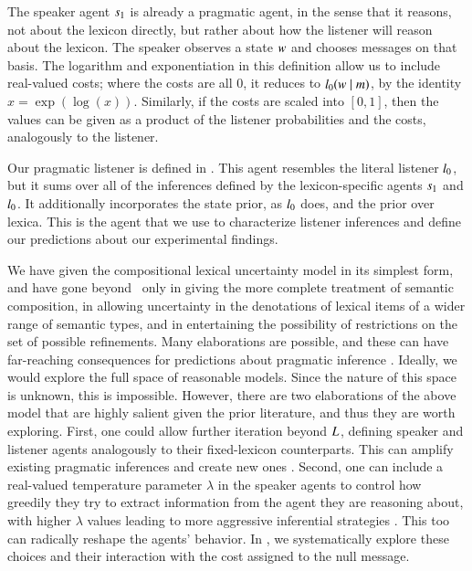 \documentclass[leqno,12pt]{article}
\begin{document}

The speaker agent $s_{1}$ is already a pragmatic agent, in the
sense that it reasons, not about the lexicon directly, but rather
about how the listener will reason about the lexicon. The speaker
observes a state $w$ and chooses messages on that basis. The
logarithm and exponentiation in this definition allow us to include
real-valued costs; where the costs are all $0$, it reduces to
$l_{0}(w \mid m)$, by the identity
$x = \exp(\log(x))$.  Similarly, if the costs are scaled into $[0,1]$,
then the values can be given as a product of the listener
probabilities and the costs, analogously to the listener.

Our pragmatic listener is defined in . This agent
resembles the literal listener $l_{0}$, but it sums over all
of the inferences defined by the lexicon-specific agents $s_{1}$
and $l_{0}$. It additionally incorporates the state prior, as
$l_{0}$ does, and the prior over lexica.  This is the agent
that we use to characterize listener inferences and define our
predictions about our experimental findings.


We have given the compositional lexical uncertainty model in its
simplest form, and have gone beyond
\citeauthor{Bergen:Levy:Goodman:2014}\ only in giving the more
complete treatment of semantic composition, in allowing uncertainty in
the denotations of lexical items of a wider range of semantic types,
and in entertaining the possibility of restrictions on the set of
possible refinements.  Many elaborations are possible, and these can
have far-reaching consequences for predictions about pragmatic
inference \citep{Goodman:Lassiter:2013, Smith:Goodman:Frank:2013,
  Kao-etal:2014,Potts:Levy:2015}. Ideally, we would explore the full
space of reasonable models. Since the nature of this space is unknown,
this is impossible. However, there are two elaborations of the above
model that are highly salient given the prior literature, and thus
they are worth exploring. First, one could allow further iteration
beyond $L_{}$, defining speaker and listener agents
analogously to their fixed-lexicon counterparts. This can amplify
existing pragmatic inferences and create new ones
\citep{Bergen:Levy:Goodman:2014,Vogel-etal:2014,Potts:Levy:2015}.
Second, one can include a real-valued temperature parameter $\lambda$
in the speaker agents to control how greedily they try to extract
information from the agent they are reasoning about, with higher
$\lambda$ values leading to more aggressive inferential strategies
\citep{Sutton:Barto:1998}. This too can radically reshape the agents'
behavior.  In , we systematically
explore these choices and their interaction with the cost assigned to
the null message.
\end{document}

